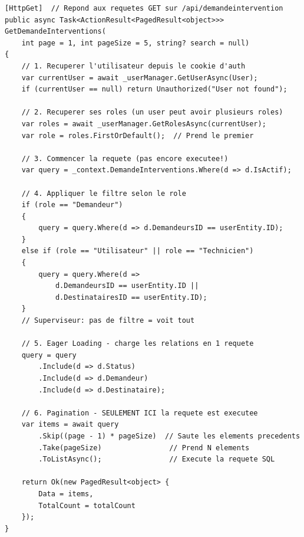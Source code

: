 \documentclass[12pt,a4paper]{article}
\begin{document}
\begin{lstlisting}[language=CSharp, caption=GET - Récupérer les interventions avec filtrage par rôle]
[HttpGet]  // Repond aux requetes GET sur /api/demandeintervention
public async Task<ActionResult<PagedResult<object>>> GetDemandeInterventions(
    int page = 1, int pageSize = 5, string? search = null)
{
    // 1. Recuperer l'utilisateur depuis le cookie d'auth
    var currentUser = await _userManager.GetUserAsync(User);
    if (currentUser == null) return Unauthorized("User not found");

    // 2. Recuperer ses roles (un user peut avoir plusieurs roles)
    var roles = await _userManager.GetRolesAsync(currentUser);
    var role = roles.FirstOrDefault();  // Prend le premier

    // 3. Commencer la requete (pas encore executee!)
    var query = _context.DemandeInterventions.Where(d => d.IsActif);

    // 4. Appliquer le filtre selon le role
    if (role == "Demandeur")
    {
        query = query.Where(d => d.DemandeursID == userEntity.ID);
    }
    else if (role == "Utilisateur" || role == "Technicien")
    {
        query = query.Where(d => 
            d.DemandeursID == userEntity.ID || 
            d.DestinatairesID == userEntity.ID);
    }
    // Superviseur: pas de filtre = voit tout

    // 5. Eager Loading - charge les relations en 1 requete
    query = query
        .Include(d => d.Status)
        .Include(d => d.Demandeur)
        .Include(d => d.Destinataire);

    // 6. Pagination - SEULEMENT ICI la requete est executee
    var items = await query
        .Skip((page - 1) * pageSize)  // Saute les elements precedents
        .Take(pageSize)                // Prend N elements
        .ToListAsync();                // Execute la requete SQL

    return Ok(new PagedResult<object> { 
        Data = items, 
        TotalCount = totalCount 
    });
}
\end{lstlisting}
\end{document}
